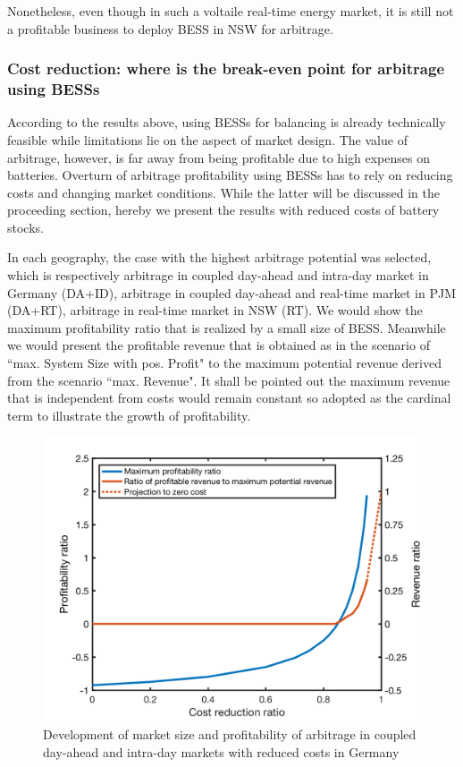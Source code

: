 Nonetheless, even though in such a voltaile real-time energy market, it is still not a profitable business to deploy BESS in NSW for arbitrage.

\subsubsection{Cost reduction: where is the break-even point for arbitrage using BESSs}
According to the results above, using BESSs for balancing is already technically feasible while limitations lie on the aspect of market design. The value of arbitrage, however, is far away from being profitable due to high expenses on batteries. Overturn of arbitrage profitability using BESSs has to rely on reducing costs and changing market conditions. While the latter will be discussed in the proceeding section, hereby we present the results with reduced costs of battery stocks. 

In each geography, the case with the highest arbitrage potential was selected, which is respectively arbitrage in coupled day-ahead and intra-day market in Germany (DA+ID), arbitrage in coupled day-ahead and real-time market in PJM (DA+RT), arbitrage in real-time market in NSW (RT). We would show the maximum profitability ratio that is realized by a small size of BESS. Meanwhile  we would present the profitable revenue that is obtained as in the scenario of ``max. System Size with pos. Profit" to the maximum potential revenue derived from the scenario ``max. Revenue". It shall be pointed out the maximum revenue that is independent from costs would remain constant so adopted as the cardinal term to illustrate the growth of profitability. 

\begin{figure}[h!]
	\centering
	\includegraphics[width=0.9\linewidth]{Figures/CostReduction_Germany_ESS}
	\caption{Development of market size and profitability of arbitrage in coupled day-ahead and intra-day markets with reduced costs in Germany}
	\label{fig:germany-ess-costreduction}
\end{figure}

